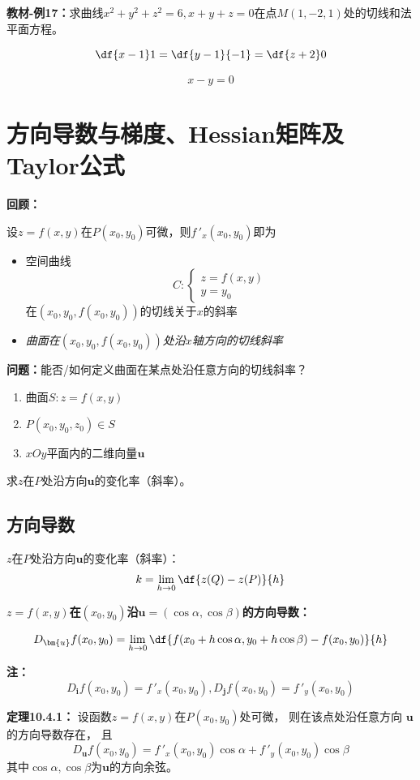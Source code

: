 {\bf 教材-例17：}求曲线$x^2+y^2+z^2=6,x+y+z=0$在点$M(1,-2,1)$处的切线和法平面方程。

$$\df{x-1}1=\df{y-1}{-1}=\df{z+2}0$$

$$x-y=0$$

\section{方向导数与梯度、Hessian矩阵及Taylor公式}

{\bf 回顾：}

设$z=f(x,y)$在$P(x_0,y_0)$可微，则$f\,'_x(x_0,y_0)$即为
\begin{itemize}
  \item 空间曲线
  $$C:\left\{\begin{array}{l}
  	z=f(x,y)\\ y=y_0
  \end{array}\right.$$
  在$(x_0,y_0,f(x_0,y_0))$的切线关于$x$的斜率
  \item {\it 曲面在$(x_0,y_0,f(x_0,y_0))$处沿$x$轴方向的切线斜率}
\end{itemize}

{\bf 问题：}能否/如何定义曲面在某点处沿任意方向的切线斜率？

\begin{enumerate}[(1)]
  \setlength{\itemindent}{1cm}
  \item 曲面$S:z=f(x,y)$ 
  \item $P(x_0,y_0,z_0)\in S$ 
  \item $xOy$平面内的二维向量$\bm{u}$ 
\end{enumerate}
求$z$在$P$处沿方向$\bm{u}$的变化率（斜率）。

\subsection{方向导数}

$z$在$P$处沿方向$\bm{u}$的变化率（斜率）： 
$$k=\lim\limits_{h\to 0}\df{z(Q)-z(P)}{h}$$

{\bf $z=f(x,y)$在$(x_0,y_0)$沿$\bm{u}=(\cos\alpha,\cos\beta)$的方向导数：}

$${D_{\bm{u}}f(x_0,y_0)=\lim\limits_{h\to 0}
\df{f(x_0+h\cos\alpha,y_0+h\cos\beta)-f(x_0,y_0)}{h}}$$

{\bf 注：}$$D_{\bm{i}}f(x_0,y_0)=f\,'_x(x_0,y_0),
D_{\bm{j}}f(x_0,y_0)=f\,'_y(x_0,y_0)$$

{\bf 定理10.4.1：}
设函数$z=f(x,y)$在$P(x_0,y_0)$处可微， 则在该点处沿任意方向
$\bm{u}$的方向导数存在， 且
$$D_{\bm{u}}f(x_0,y_0) =f\,'_x(x_0,y_0)\cos\alpha+f\,'_y(x_0,y_0)\cos\beta$$
其中$\cos\alpha,\cos\beta$为$\bm{u}$的方向余弦。

